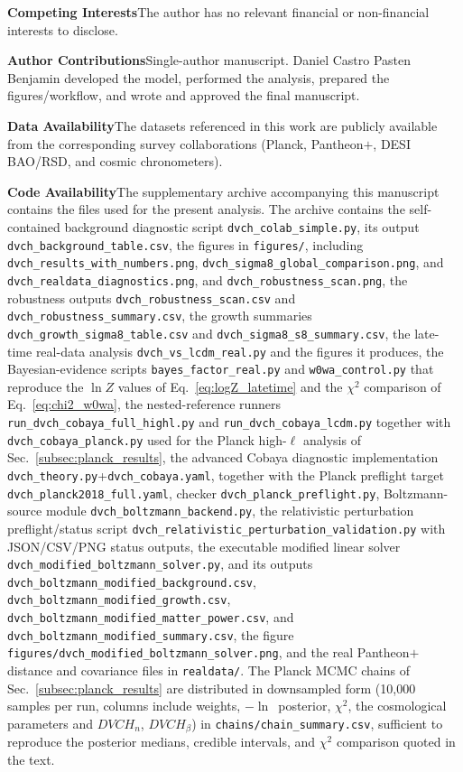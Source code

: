 \documentclass[pdflatex,sn-mathphys-num]{sn-jnl}%
\begin{document}
\textbf{Competing Interests}\quad The author has no relevant financial or
non-financial interests to disclose.

\textbf{Author Contributions}\quad Single-author manuscript. Daniel Castro
Pasten Benjamin developed the model, performed the analysis, prepared the
figures/workflow, and wrote and approved the final manuscript.

\textbf{Data Availability}\quad The datasets referenced in this work are
publicly available from the corresponding survey collaborations (Planck,
Pantheon$+$, DESI BAO/RSD, and cosmic chronometers).

\textbf{Code Availability}\quad The supplementary archive accompanying this manuscript contains the files used for the present analysis. The archive contains the
self-contained background diagnostic script \texttt{dvch\_colab\_simple.py},
its output \texttt{dvch\_background\_table.csv}, the
figures in \texttt{figures/}, including \texttt{dvch\_results\_with\_numbers.png},
\texttt{dvch\_sigma8\_global\_comparison.png}, and
\texttt{dvch\_realdata\_diagnostics.png}, and
\texttt{dvch\_robustness\_scan.png}, the robustness outputs
\texttt{dvch\_robustness\_scan.csv} and
\texttt{dvch\_robustness\_summary.csv}, the growth summaries
\texttt{dvch\_growth\_sigma8\_table.csv} and
\texttt{dvch\_sigma8\_s8\_summary.csv}, the late-time real-data analysis
\texttt{dvch\_vs\_lcdm\_real.py} and the figures it produces, the Bayesian-evidence
scripts \texttt{bayes\_factor\_real.py} and \texttt{w0wa\_control.py} that
reproduce the $\ln Z$ values of Eq.~\eqref{eq:logZ_latetime} and the
$\chi^2$ comparison of Eq.~\eqref{eq:chi2_w0wa}, the nested-reference
runners \texttt{run\_dvch\_cobaya\_full\_highl.py} and
\texttt{run\_dvch\_cobaya\_lcdm.py} together with
\texttt{dvch\_cobaya\_planck.py} used for the Planck high-$\ell$ analysis of
Sec.~\ref{subsec:planck_results}, the advanced Cobaya diagnostic implementation
\texttt{dvch\_theory.py}+\texttt{dvch\_cobaya.yaml}, together
with the Planck preflight target \texttt{dvch\_planck2018\_full.yaml},
checker \texttt{dvch\_planck\_preflight.py}, Boltzmann-source module
\texttt{dvch\_boltzmann\_backend.py}, the relativistic perturbation preflight/status script
\texttt{dvch\_relativistic\_perturbation\_validation.py} with JSON/CSV/PNG
status outputs, the executable modified linear solver
\texttt{dvch\_modified\_boltzmann\_solver.py}, and its outputs
\texttt{dvch\_boltzmann\_modified\_background.csv},
\texttt{dvch\_boltzmann\_modified\_growth.csv},
\texttt{dvch\_boltzmann\_modified\_matter\_power.csv}, and
\texttt{dvch\_boltzmann\_modified\_summary.csv}, the figure
\texttt{figures/dvch\_modified\_boltzmann\_solver.png}, and the real
Pantheon$+$ distance and covariance files in \texttt{realdata/}. The
Planck MCMC chains of Sec.~\ref{subsec:planck_results} are
distributed in downsampled form (10{,}000 samples per run, columns include
weights, $-\ln$~posterior, $\chi^2$, the cosmological parameters and
$DVCH_n$, $DVCH_\beta$) in \texttt{chains/chain\_summary.csv}, sufficient to
reproduce the posterior medians, credible intervals, and $\chi^2$ comparison
quoted in the text.
\end{document}
